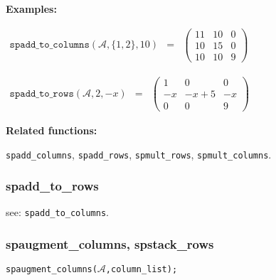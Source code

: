 \textbf{Examples:}

\begin{flushleft}  
\hspace*{0.175in}
\begin{math}
\begin{array}{ccc}
\texttt{spadd\_to\_columns}(\mathcal{A},\{1,2\},10) & = & 
\left( \begin{array}{ccc} 11 & 10 & 0 \\ 10 & 15 & 0 \\ 10 & 10 & 9 
\end{array} \right)  
\end{array}
\end{math}
\end{flushleft}

\vspace*{0.1in}

\begin{flushleft}  
\hspace*{0.175in}
\begin{math}
\begin{array}{ccc}
\texttt{spadd\_to\_rows}(\mathcal{A},2,-x) & = & 
\left( \begin{array}{ccc} 1 & 0 & 0 \\ -x & -x+5 & -x \\ 0 & 0 & 9 
\end{array} \right)  
\end{array}
\end{math}
\end{flushleft}

\textbf{Related functions:}

\hspace*{0.175in} 
\texttt{spadd\_columns}, \texttt{spadd\_rows}, \texttt{spmult\_rows}, 
\texttt{spmult\_columns}.


\subsubsection{spadd\_to\_rows}

\hspace*{0.175in} see: \texttt{spadd\_to\_columns}.


\subsubsection{spaugment\_columns, spstack\_rows}

\hspace*{0.175in} \texttt{spaugment\_columns($\mathcal{A}$,column\_list);}

